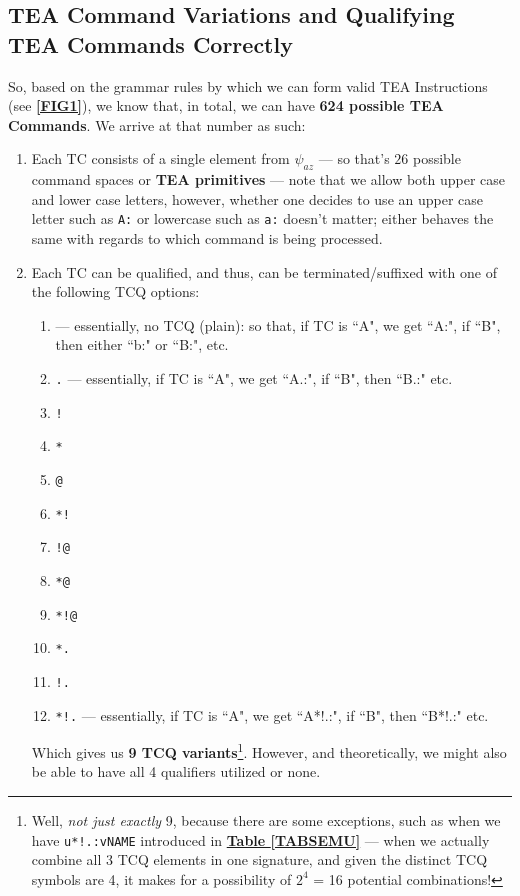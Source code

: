 \documentclass[a4paper, 18pt]{book} %
\begin{document}
\subsection{TEA Command Variations and Qualifying TEA Commands Correctly}
\label{SECQUALIFY}

So, based on the grammar rules by which we can form valid TEA Instructions (see \textbf{\autoref{FIG1}}), we know that, in total, we can have \textbf{624 possible TEA Commands}. We arrive at that number as such:

\begin{enumerate}
\item Each TC consists of a single element from $\psi_{az}$ --- so that's $26$ possible command spaces or \textbf{TEA primitives} --- note that we allow both upper case and lower case letters, however, whether one decides to use an upper case letter such as \texttt{A:} or lowercase such as \texttt{a:} doesn't matter; either behaves the same with regards to which command is being processed.
\item{Each TC can be qualified, and thus, can be terminated/suffixed with one of the following TCQ options:

\begin{enumerate}
\item \texttt{} --- essentially, no TCQ (plain): so that, if TC is ``A", we get ``A:", if ``B", then either ``b:" or ``B:", etc.
\item \texttt{.} --- essentially, if TC is ``A", we get ``A.:", if ``B", then ``B.:" etc.
\item \texttt{!}
\item \texttt{*}
\item \texttt{@}
\item \texttt{*!}
\item \texttt{!@}
\item \texttt{*@}
\item \texttt{*!@}
\item \texttt{*.}
\item \texttt{!.}
\item \texttt{*!.} --- essentially, if TC is ``A", we get ``A*!.:", if ``B", then ``B*!.:" etc.
\end{enumerate}

Which gives us \textbf{9 TCQ variants}\footnote{Well, \textit{not just exactly} 9, because there are some exceptions, such as when we have \texttt{u*!.:vNAME} introduced in \textbf{\hyperref[TABSEMU]{Table \ref{TABSEMU}}} --- when we actually combine all 3 TCQ elements in one signature, and given the distinct TCQ symbols are 4, it makes for a possibility of $2^4$ = 16 potential combinations!}. However, and theoretically, we might also be able to have all 4 qualifiers utilized or none.
}
\end{enumerate}
\end{document}
